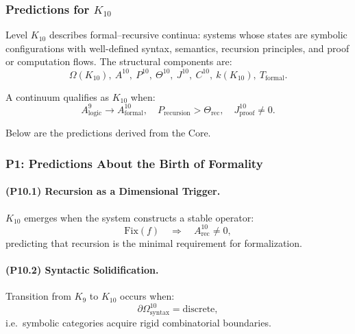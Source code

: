 

\subsubsection{Predictions for $K_{10}$}
\label{sec:predictions-k10}

Level $K_{10}$ describes formal–recursive continua: 
systems whose states are symbolic configurations with 
well-defined syntax, semantics, recursion principles, 
and proof or computation flows.  
The structural components are:
\[
\Omega(K_{10}),\ 
A^{10},\ 
P^{10},\ 
\Theta^{10},\ 
J^{10},\ 
C^{10},\ 
k(K_{10}),\ 
T_{\mathrm{formal}}.
\]

A continuum qualifies as $K_{10}$ when:
\[
A_{\mathrm{logic}}^{9} \to A_{\mathrm{formal}}^{10}, \quad
P_{\mathrm{recursion}} > \Theta_{\mathrm{rec}}, \quad
J_{\mathrm{proof}}^{10} \neq 0.
\]

Below are the predictions derived from the Core.

\subsubsection{P1: Predictions About the Birth of Formality}

\paragraph{(P10.1) Recursion as a Dimensional Trigger.}
$K_{10}$ emerges when the system constructs a stable operator:
\[
\mathrm{Fix}(f) \quad \Rightarrow \quad A_{\mathrm{rec}}^{10} \neq 0,
\]
predicting that recursion is the minimal requirement for formalization.

\paragraph{(P10.2) Syntactic Solidification.}
Transition from $K_9$ to $K_{10}$ occurs when:
\[
\partial\Omega_{\mathrm{syntax}}^{10} = \text{discrete},
\]
i.e.\ symbolic categories acquire rigid combinatorial boundaries.

